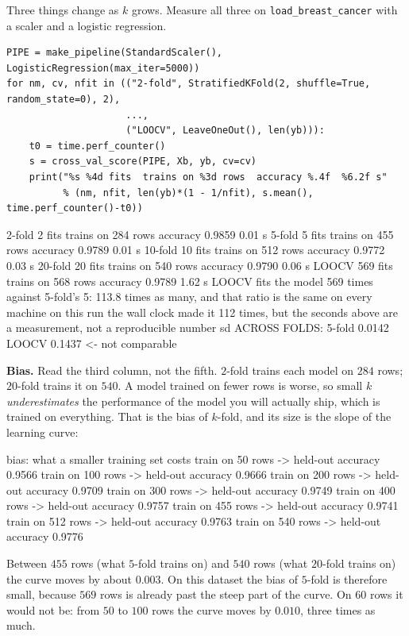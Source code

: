 \documentclass[11pt]{article}
\begin{document}
Three things change as $k$ grows. Measure all three on
\texttt{load\_breast\_cancer} with a scaler and a logistic regression.

\begin{lstlisting}
PIPE = make_pipeline(StandardScaler(), LogisticRegression(max_iter=5000))
for nm, cv, nfit in (("2-fold", StratifiedKFold(2, shuffle=True, random_state=0), 2),
                     ...,
                     ("LOOCV", LeaveOneOut(), len(yb))):
    t0 = time.perf_counter()
    s = cross_val_score(PIPE, Xb, yb, cv=cv)
    print("%s %4d fits  trains on %3d rows  accuracy %.4f  %6.2f s"
          % (nm, nfit, len(yb)*(1 - 1/nfit), s.mean(), time.perf_counter()-t0))
\end{lstlisting}
\begin{codeout}
   2-fold      2 fits   trains on 284 rows   accuracy 0.9859     0.01 s
   5-fold      5 fits   trains on 455 rows   accuracy 0.9789     0.01 s
   10-fold    10 fits   trains on 512 rows   accuracy 0.9772     0.03 s
   20-fold    20 fits   trains on 540 rows   accuracy 0.9790     0.06 s
   LOOCV     569 fits   trains on 568 rows   accuracy 0.9789     1.62 s
   LOOCV fits the model 569 times against 5-fold's 5: 113.8 times as many,
   and that ratio is the same on every machine
   on this run the wall clock made it 112 times, but the seconds above are
   a measurement, not a reproducible number
   sd ACROSS FOLDS: 5-fold 0.0142   LOOCV 0.1437  <- not comparable
\end{codeout}

\textbf{Bias.} Read the third column, not the fifth. $2$-fold trains each
model on $284$ rows; $20$-fold trains it on $540$. A model trained on fewer
rows is worse, so small $k$ \emph{underestimates} the performance of the model
you will actually ship, which is trained on everything. That is the bias of
$k$-fold, and its size is the slope of the learning curve:

\begin{codeout}
bias: what a smaller training set costs
   train on  50 rows  ->  held-out accuracy 0.9566
   train on 100 rows  ->  held-out accuracy 0.9666
   train on 200 rows  ->  held-out accuracy 0.9709
   train on 300 rows  ->  held-out accuracy 0.9749
   train on 400 rows  ->  held-out accuracy 0.9757
   train on 455 rows  ->  held-out accuracy 0.9741
   train on 512 rows  ->  held-out accuracy 0.9763
   train on 540 rows  ->  held-out accuracy 0.9776
\end{codeout}

Between $455$ rows (what $5$-fold trains on) and $540$ rows (what $20$-fold
trains on) the curve moves by about $0.003$. On this dataset the bias of
$5$-fold is therefore small, because $569$ rows is already past the steep part
of the curve. On $60$ rows it would not be: from $50$ to $100$ rows the curve
moves by $0.010$, three times as much.
\end{document}
